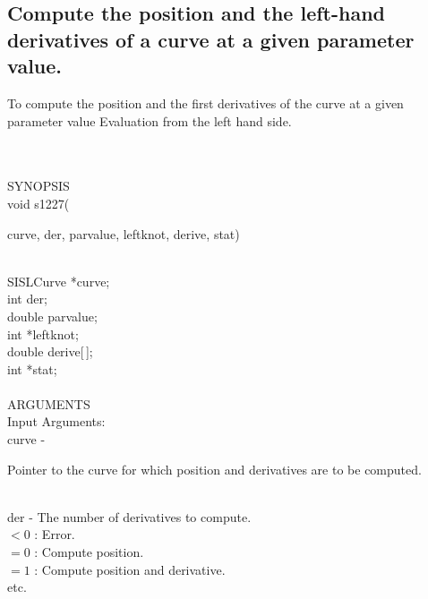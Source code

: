 \subsection{Compute the position and the left-hand derivatives of a
curve at a given parameter value.}
\begin{minipg1}
  To compute the position and the first derivatives of the curve at a
  given parameter value
  Evaluation from the left hand side.
\end{minipg1} \\ \\
SYNOPSIS\\
        \>void s1227(\begin{minipg3}
        {\fov curve}, {\fov der}, {\fov parvalue}, {\fov leftknot},
        {\fov derive}, {\fov stat})
                \end{minipg3}\\[0.3ex]
                \>\>    SISLCurve       \>      *{\fov curve};\\
                \>\>    int     \>      {\fov der};\\
                \>\>    double  \>      {\fov parvalue};\\
                \>\>    int     \>      *{\fov leftknot};\\
                \>\>    double  \>      {\fov derive}[\,];\\
                \>\>    int     \>      *{\fov stat};\\
\\
ARGUMENTS\\
        \>Input Arguments:\\
        \>\>    {\fov curve}    \> - \> \begin{minipg2}
                                Pointer to the curve for which position and
                                derivatives are to be computed.
                                \end{minipg2}\\[0.3ex]
        \>\>    {\fov der}      \> - \> The number of derivatives to compute.\\
                \>\>\>\>\>              $< 0$   : Error.\\
                \>\>\>\>\>              $= 0$   : Compute position.\\
                \>\>\>\>\>              $= 1$   : Compute position and derivative.\\
                \>\>\>\>\>              etc.\\
